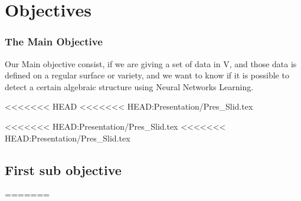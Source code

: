 \documentclass{beamer}
\begin{document}
\section{Objectives}
\begin{frame}
    \frametitle{The Main Objective}
    Our Main objective consist,  if we are giving a set of data in V, and those data is defined on a regular surface or variety, and we want to know if it is possible to detect a certain algebraic structure using Neural Networks Learning.
\end{frame}
<<<<<<< HEAD
<<<<<<< HEAD:Presentation/Pres_Slid.tex

<<<<<<< HEAD:Presentation/Pres_Slid.tex
<<<<<<< HEAD:Presentation/Pres_Slid.tex
\subsection{First sub objective} 
=======
\end{document}
